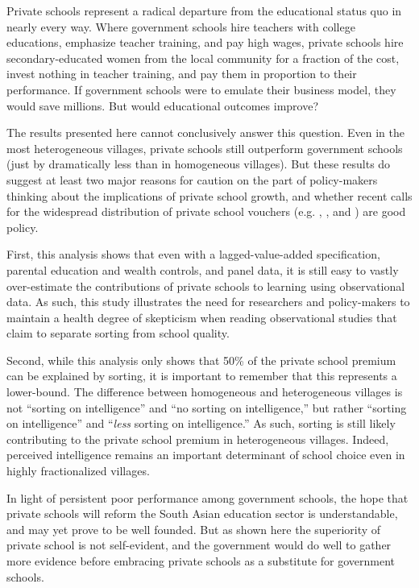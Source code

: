 \documentclass[Eubank_pk_ethnic_sorting.tex]{subfiles}
\begin{document}
Private schools represent a radical departure from the educational status quo in nearly every way. Where government schools hire teachers with college educations, emphasize teacher training, and pay high wages, private schools hire secondary-educated women from the local community for a fraction of the cost, invest nothing in teacher training, and pay them in proportion to their performance. If government schools were to emulate their business model, they would save millions. But would educational outcomes improve? 

The results presented here cannot conclusively answer this question. Even in the most heterogeneous villages, private schools still outperform government schools (just by dramatically less than in homogeneous villages). But these results do suggest at least two major reasons for caution on the part of policy-makers thinking about the implications of private school growth, and whether recent calls for the widespread distribution of private school vouchers (e.g. \cite{Chakrabarti:2008vc}, \cite{Kelkar:2006tq}, and \cite{Panagariya:2008wi}) are good policy.

First, this analysis shows that even with a lagged-value-added specification, parental education and wealth controls, and panel data, it is still easy to vastly over-estimate the contributions of private schools to learning using observational data. As such, this study illustrates the need for researchers and policy-makers to maintain a health degree of skepticism when reading observational studies that claim to separate sorting from school quality.

Second, while this analysis only shows that 50\% of the private school premium can be explained by sorting, it is important to remember that this represents a lower-bound. The difference between homogeneous and heterogeneous villages is not ``sorting on intelligence'' and ``no sorting on intelligence,'' but rather ``sorting on intelligence'' and ``\emph{less} sorting on intelligence.'' As such, sorting is still likely contributing to the private school premium in heterogeneous villages. Indeed, perceived intelligence remains an important determinant of school choice even in highly fractionalized villages. 

In light of persistent poor performance among government schools, the hope that private schools will reform the South Asian education sector is understandable, and may yet prove to be well founded. But as shown here the superiority of private school is not self-evident, and the government would do well to gather more evidence before embracing private schools as a substitute for government schools. 
\end{document}
